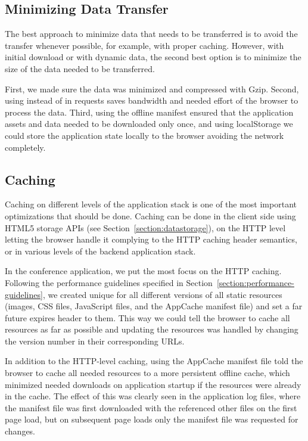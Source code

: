 \subsection{Minimizing Data Transfer}

The best approach to minimize data that needs to be transferred is to
avoid the transfer whenever possible, for example, with proper
caching. However, with initial download or with dynamic data, the
second best option is to minimize the size of the data needed to be
transferred.

First, we made sure the data was minimized and compressed with
Gzip. Second, using  instead of  in 
requests saves bandwidth \citationneeded and needed effort of the
browser to process the data. Third, using the offline manifest ensured
that the application assets and data needed to be downloaded only
once, and using localStorage we could store the application state
locally to the browser avoiding the network completely.

\subsection{Caching}

Caching on different levels of the application stack is one of the
most important optimizations that should be done. Caching can be done
in the client side using HTML5 storage APIs (see
Section~\ref{section:datastorage}), on the HTTP level letting the
browser handle it complying to the HTTP caching header semantics, or
in various levels of the backend application stack.

In the conference application, we put the most focus on the HTTP
caching. Following the performance guidelines specified in
Section~\ref{section:performance-guidelines}, we created unique
 for all different versions of all static resources
(images, CSS files, JavaScript files, and the AppCache manifest file)
and set a far future expires header to them. This way we could tell
the browser to cache all resources as far as possible and updating the
resources was handled by changing the version number in their
corresponding URLs.

In addition to the HTTP-level caching, using the AppCache manifest
file told the browser to cache all needed resources to a more
persistent offline cache, which minimized needed downloads on
application startup if the resources were already in the cache. The
effect of this was clearly seen in the application log files, where
the manifest file was first downloaded with the referenced other files
on the first page load, but on subsequent page loads only the manifest
file was requested for changes.

